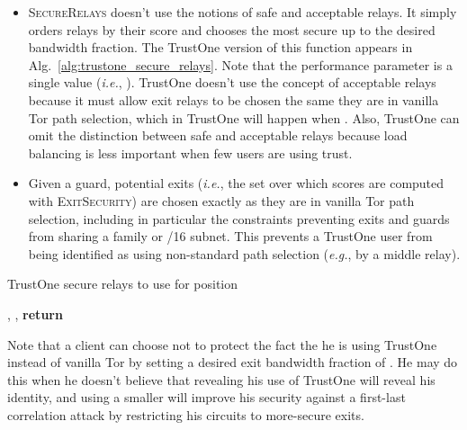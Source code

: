 \documentclass[conference]{styles/IEEEtran}
\newcommand{\eg}{\emph{e.g.}}
\newcommand{\ie}{\emph{i.e.}}
\newcommand{\compactify}{\settowidth{\labelsep}{o} \settowidth{\labelwidth}{o} \settowidth{\labelindent}{o}}
\begin{document}
\begin{itemize}[\compactify]
\item \textsc{SecureRelays} doesn't use the notions of safe and acceptable relays. It simply
orders relays by their score and chooses the most secure up to the desired bandwidth fraction.
The TrustOne version of this function appears in Alg.~\ref{alg:trustone_secure_relays}. Note that
the performance parameter is a single value (\ie{}, ). TrustOne
doesn't use the concept of acceptable relays because it must allow exit relays to be chosen the same
they are in vanilla Tor path selection, which in TrustOne will happen when
. Also, TrustOne can omit the distinction between safe and acceptable relays
because load balancing is less important when few users are using trust.

\item Given a guard, potential exits (\ie{}, the set over which scores are computed with
\textsc{ExitSecurity})
are chosen exactly as they are in vanilla Tor path selection,
including in particular the constraints preventing exits and guards from sharing a family or /16
subnet. This prevents a TrustOne user from being identified as using non-standard path selection
(\eg{}, by a middle relay).
\end{itemize}

\begin{algorithm}
\caption{TrustOne secure relays to use for position }
\label{alg:trustone_secure_relays}
\begin{algorithmic}[0]
\State  {}
\State , , 
\While{} 
  \State 
  \State 
  \State 
\EndWhile
\State \textbf{return} 
\EndFunction
\end{algorithmic}
\end{algorithm}

Note that a client can choose not to protect the fact the he is using TrustOne instead of vanilla
Tor by setting a desired exit bandwidth fraction of . He may do this when he
doesn't believe that revealing his use of TrustOne will reveal his identity, and using a smaller
 will improve his security against a first-last correlation attack by restricting
his circuits to more-secure exits.
\end{document}
